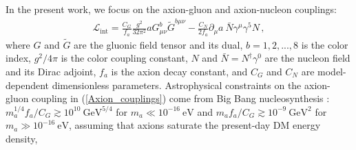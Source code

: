 In the present work, we focus on the axion-gluon and axion-nucleon couplings:
\begin{align}
\label{Axion_couplings}
\mathcal{L}_{\textrm{int}} = \frac{C_G}{f_a} \frac{g^2}{32\pi^2} a G^{b}_{\mu \nu} \tilde{G}^{b \mu \nu}  - \frac{C_N}{2f_a} \partial_\mu a ~ \bar{N} \gamma^\mu \gamma^5 N \, ,
\end{align}
where $G$ and $\tilde{G}$ are the gluonic field tensor and its dual, $b=1,2,...,8$ is the  color index, $g^2 / 4 \pi$ is the color coupling constant, {\color{black}$N$ and $\bar{N} = N^\dagger \gamma^0$ are the nucleon field and its Dirac adjoint,} $f_a$ is the axion decay constant, and $C_G$ and {\color{black}$C_N$} are model-dependent dimensionless parameters.
Astrophysical constraints on the axion-gluon coupling in (\ref{Axion_couplings}) come from Big Bang nucleosynthesis \cite{Blum2014,StadnikThesis,Stadnik2015D}:~$m_a^{1/4} f_a / C_G \gtrsim 10^{10}~\textrm{GeV}^{5/4}$ for $m_a \ll 10^{-16}~\textrm{eV}$ and $m_a f_a / C_G \gtrsim 10^{-9}~\textrm{GeV}^{2}$ for $m_a \gg 10^{-16}~\textrm{eV}$, assuming that axions saturate the present-day DM energy density, %
